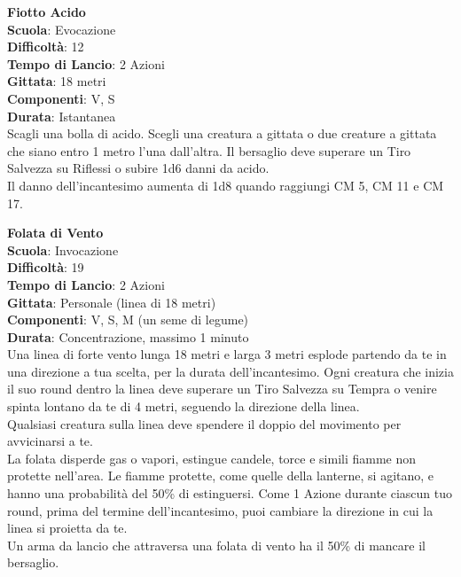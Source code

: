 \begin{multicols}{2}
\medskip\textbf{Fiotto Acido}\\
\textbf{Scuola}: Evocazione\\
\textbf{Difficoltà}: 12\\
\textbf{Tempo di Lancio}: 2 Azioni\\
\textbf{Gittata}: 18 metri\\
\textbf{Componenti}: V, S\\
\textbf{Durata}: Istantanea\\
Scagli una bolla di acido. Scegli una creatura a gittata o due creature a gittata che siano entro 1 metro l'una dall'altra. Il bersaglio deve superare un Tiro Salvezza su Riflessi o subire 1d6 danni da acido.\\
Il danno dell'incantesimo aumenta di 1d8 quando raggiungi CM 5, CM 11 e CM 17.

\medskip\textbf{Folata di Vento}\\
\textbf{Scuola}: Invocazione\\
\textbf{Difficoltà}: 19\\
\textbf{Tempo di Lancio}: 2 Azioni\\
\textbf{Gittata}: Personale (linea di 18 metri)\\
\textbf{Componenti}: V, S, M (un seme di legume)\\
\textbf{Durata}: Concentrazione, massimo 1 minuto\\
Una linea di forte vento lunga 18 metri e larga 3 metri esplode partendo da te in una direzione a tua scelta, per la durata dell'incantesimo. Ogni creatura che inizia il suo round dentro la linea deve superare un Tiro Salvezza su Tempra o venire spinta lontano da te di 4 metri, seguendo la direzione della linea.\\
Qualsiasi creatura sulla linea deve spendere il doppio del movimento per avvicinarsi a te.\\
La folata disperde gas o vapori, estingue candele, torce e simili fiamme non protette nell'area. Le fiamme protette, come quelle della lanterne, si agitano, e hanno una probabilità del 50\% di estinguersi. Come 1 Azione durante ciascun tuo round, prima del termine dell'incantesimo, puoi cambiare la direzione in cui la linea si proietta da te.\\
Un arma da lancio che attraversa una folata di vento ha il 50\% di mancare il bersaglio.


\end{multicols}
